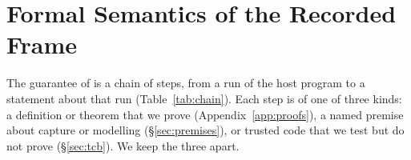 \providecommand{\Sc}[1]{\mathit{Sc}_{#1}}
\providecommand{\ASc}[2]{\mathit{ASc}_{#1}^{#2}}
\providecommand{\ESs}{\mathit{ES}^{\mathrm{src}}}
\providecommand{\ESd}{\mathit{ES}^{\mathrm{dst}}}
\providecommand{\AS}{\mathit{AS}}
\providecommand{\chainto}{\rightsquigarrow}
\providecommand{\mspecl}[1]{\ensuremath{\Rightarrow_{m}^{#1}}}
\providecommand{\ordl}[1]{\mathit{ord}_{#1}}
\providecommand{\Hpw}{\ensuremath{\Haz_C^{\mathit{pw}}}}
\providecommand{\Hep}{\ensuremath{\Haz_C^{\mathit{ep}}}}
\providecommand{\Hspec}{\ensuremath{\Haz_{\mathit{spec}}}}
\providecommand{\kw}[1]{\textbf{#1}}
\providecommand{\pc}[1]{\textsc{#1}}
\providecommand{\posof}{\pi}
\providecommand{\Hstrict}{\ensuremath{\Haz_{\mathit{spec}}^{\mathit{dom}}}}

\section{Formal Semantics of the Recorded Frame}
\label{sec:model}

The guarantee of \sys is a chain of steps, from a run of the host program to a statement about that run
(Table~\ref{tab:chain}). Each step is of one of three kinds: a definition or theorem that we prove
(Appendix~\ref{app:proofs}), a named premise about capture or modelling (\S\ref{sec:premises}), or trusted code
that we test but do not prove (\S\ref{sec:tcb}). We keep the three apart.


